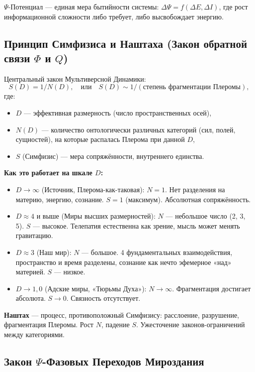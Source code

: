 \documentclass[a4paper,12pt]{article}
\begin{document}
$\Psi$-Потенциал — единая мера бытийности системы: $\Delta\Psi = f(\Delta E, \Delta I)$, где рост информационной сложности либо требует, либо высвобождает энергию.

\subsection{Принцип Симфизиса и Наштаха (Закон обратной связи $\Phi$ и $Q$)}

Центральный закон Мультиверсной Динамики:
\[
S(D) = 1 / N(D), \quad \text{или} \quad S(D) \sim 1 / (\text{степень фрагментации Плеромы}),
\]
где:
\begin{itemize}
	\item $D$ — эффективная размерность (число пространственных осей),
	\item $N(D)$ — количество онтологически различных категорий (сил, полей, сущностей), на которые распалась Плерома при данной $D$,
	\item $S$ (Симфизис) — мера сопряжённости, внутреннего единства.
\end{itemize}

\textbf{Как это работает на шкале $D$:}
\begin{itemize}
	\item $D \to \infty$ (Источник, Плерома-как-таковая): $N = 1$. Нет разделения на материю, энергию, сознание. $S = 1$ (максимум). Абсолютная сопряжённость.
	\item $D \approx 4$ и выше (Миры высших размерностей): $N$ — небольшое число (2, 3, 5). $S$ — высокое. Телепатия естественна как зрение, мысль может менять гравитацию.
	\item $D \approx 3$ (Наш мир): $N$ — большое. 4 фундаментальных взаимодействия, пространство и время разделены, сознание как нечто эфемерное «над» материей. $S$ — низкое.
	\item $D \to 1, 0$ (Адские миры, «Тюрьмы Духа»): $N \to \infty$. Фрагментация достигает абсолюта. $S \to 0$. Связность отсутствует.
\end{itemize}

\textbf{Наштах} — процесс, противоположный Симфизису: расслоение, разрушение, фрагментация Плеромы. Рост $N$, падение $S$. Ужесточение законов-ограничений между категориями.

\subsection{Закон $\Psi$-Фазовых Переходов Мироздания}
\end{document}
